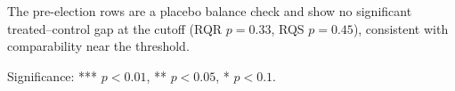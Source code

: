 \begin{table}[H]
\begin{threeparttable}
\begin{minipage}{\linewidth}
\begin{tablenotes}[flushleft]
        The pre-election rows are a placebo balance check and show no significant treated--control gap at the cutoff (RQR $p=0.33$, RQS $p=0.45$), consistent with comparability near the threshold.
        \item Significance: *** $p<0.01$, ** $p<0.05$, * $p<0.1$.
    \end{tablenotes}
    \end{minipage}
    \end{threeparttable}
\end{table}
